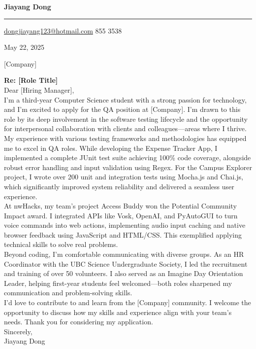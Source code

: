 \documentclass[letterpaper,12pt]{article}
\begin{document}
    \color{almost_black}
    
    {\fontsize{24pt}{28pt}\selectfont \textbf{Jiayang Dong} \par}
    \vspace{-1.5mm}
    \noindent\rule{\linewidth}{1.5pt}
    \vspace{3mm}
    \href{mailto:dongjiayang123@hotmail.com}{dongjiayang123@hotmail.com}  855 3538

    \vspace{3.5mm}
    May 22, 2025 \newline
 
    [Company] \newline
    [Address] \newline
     
    \textbf{Re: [Role Title]} \\
    
    Dear [Hiring Manager], \\
     
    I’m a third-year Computer Science student with a strong passion for technology, and I’m excited to apply for the QA position at [Company]. I’m drawn to this role by its deep involvement in the software testing lifecycle and the opportunity for interpersonal collaboration with clients and colleagues—areas where I thrive. \\
    
    My experience with various testing frameworks and methodologies has equipped me to excel in QA roles. While developing the Expense Tracker App, I implemented a complete JUnit test suite achieving 100\% code coverage, alongside robust error handling and input validation using Regex. For the Campus Explorer project, I wrote over 200 unit and integration tests using Mocha.js and Chai.js, which significantly improved system reliability and delivered a seamless user experience. \\
    
    At nwHacks, my team’s project Access Buddy won the Potential Community Impact award. I integrated APIs like Vosk, OpenAI, and PyAutoGUI to turn voice commands into web actions, implementing audio input caching and native browser feedback using JavaScript and HTML/CSS. This exemplified applying technical skills to solve real problems. \\
    
    Beyond coding, I’m comfortable communicating with diverse groups. As an HR Coordinator with the UBC Science Undergraduate Society, I led the recruitment and training of over 50 volunteers. I also served as an Imagine Day Orientation Leader, helping first-year students feel welcomed—both roles sharpened my communication and problem-solving skills. \\
    
    I'd love to contribute to and learn from the [Company] community. I welcome the opportunity to discuss how my skills and experience align with your team's needs. Thank you for considering my application. \\
    
    Sincerely, \\
    Jiayang Dong 
\end{document}

